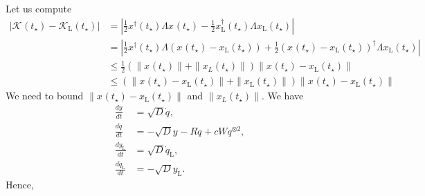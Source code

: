 \documentclass[superscriptaddress,onecolumn,nofootinbib,longbibliography,a4paper,accepted=2026-09-29]{quantumarticle}
\theoremstyle{plain}
\theoremstyle{definition}
\numberwithin{thm}{section}
\numberwithin{assumption}{section}
\numberwithin{lemma}{section}
\numberwithin{prop}{section}
\numberwithin{cor}{section}
\numberwithin{definition}{section}
\numberwithin{rmk}{section}
\numberwithin{equation}{section}
\begin{document}
Let us compute
\begin{align}
  |\mathcal{K}_{}(t_\star) -   \mathcal{K}_{\mathrm{L}}(t_\star)| & = \left| \frac{1}{2}x_{}^\dag(t_\star) \Lambda x_{}(t_\star) - \frac{1}{2}x_{\mathrm{L}}^\dag(t_\star) \Lambda x_{\mathrm{L}}(t_\star) \right|\\ 
   & = \left| \frac{1}{2}x_{}^\dag(t_\star) \Lambda (x_{}(t_\star) - x_{\mathrm{L}}(t_\star) ) +  \frac{1}{2}(x_{}(t_\star)- x_{\mathrm{L}}(t_\star))^\dag \Lambda x_{\mathrm{L}}(t_\star) \right| \\
   & \leq  \frac{1}{2}(\|x_{}(t_\star)\|+\|x_{L}(t_\star)\|) \| x_{}(t_\star)- x_{\mathrm{L}}(t_\star)\|
  \\ & \leq (\|x_{}(t_\star)- x_{\mathrm{L}}(t_\star)\| + \|x_{\mathrm{L}}(t_\star) \|)  \|x_{}(t_\star)- x_{\mathrm{L}}(t_\star)\|
\end{align}
We need to bound $ \| x_{}(t_\star) -  x_{\mathrm{L}}(t_\star)\|$ and $\|x_L(t_\star)\|$. We have
\begin{align}
     \frac{d y_{}}{dt} &= \sqrt{D} \dot{q}_{}, \\
     \frac{d \dot{q}_{}}{dt} &= -\sqrt{D} y_{} - R \dot{q}_{} + c W q_{}^{\otimes 2}, \\
        \frac{d y_{\mathrm{L}}}{dt}  &= \sqrt{D} \dot{q}_{\mathrm{L}}, \\
     \frac{d \dot{q}_{\mathrm{L}}}{dt} &= -\sqrt{D} y_{\mathrm{L}}.
\end{align}
Hence,
\end{document}
